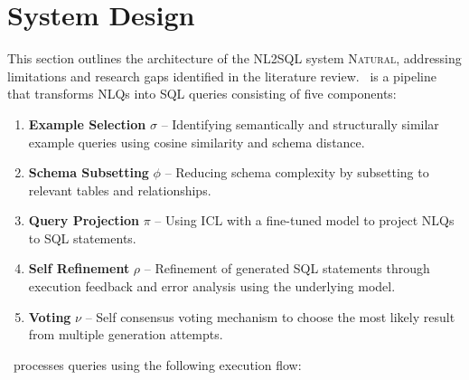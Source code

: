 \section{System Design}\label{section:design}

This section outlines the architecture of the NL2SQL system \textsc{Natural},
addressing limitations and research gaps identified in the literature
review. \Natural~is a pipeline that transforms NLQs into SQL queries consisting
of five components:

\begin{enumerate}
    \item \textbf{Example Selection} $\sigma$ – Identifying semantically and
        structurally similar example queries using cosine similarity and schema
        distance.
    \item \textbf{Schema Subsetting} $\phi$ – Reducing schema complexity by
        subsetting to relevant tables and relationships.
    \item \textbf{Query Projection} $\pi$ – Using ICL with a fine-tuned
        model to project NLQs to SQL statements.
    \item \textbf{Self Refinement} $\rho$ – Refinement of generated
        SQL statements through execution feedback and error analysis using the
        underlying model.
    \item \textbf{Voting} $\nu$ – Self consensus voting mechanism to choose the
        most likely result from multiple generation attempts.
\end{enumerate}

\Natural~processes queries using the following execution flow:

